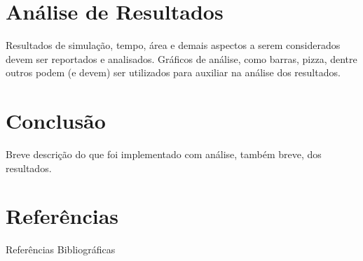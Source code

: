\documentclass[12pt,openright,oneside,a4paper,english,brazil]{abntex2}
\begin{document}
\newpage

\chapter*{Análise de Resultados}
Resultados de simulação, tempo, área e demais aspectos a serem considerados devem ser reportados e analisados. Gráficos de análise, como barras, pizza, dentre outros podem (e devem) ser utilizados para auxiliar na análise dos resultados.

\newpage

\chapter*{Conclusão}
Breve descrição do que foi implementado com análise, também breve, dos resultados.

\newpage

\chapter*{Referências}
Referências Bibliográficas
\end{document}
